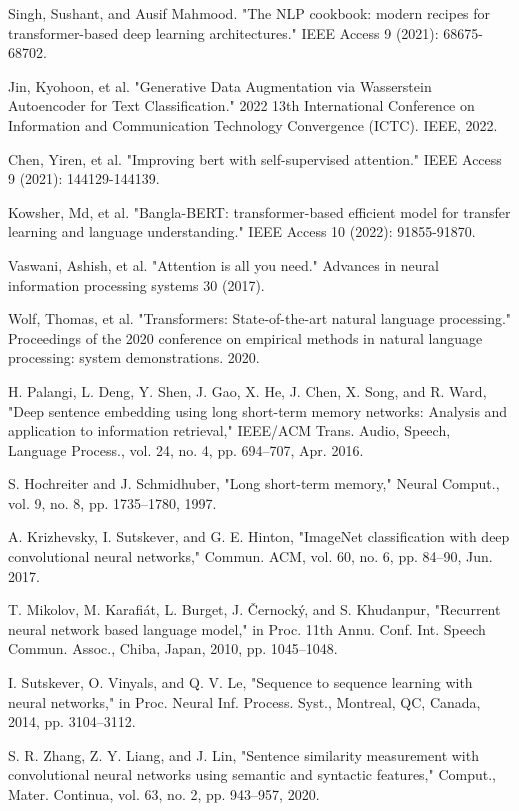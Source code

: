 \documentclass[conference]{IEEEtran}
\begin{document}
\begin{thebibliography}{00}
 Singh, Sushant, and Ausif Mahmood. "The NLP cookbook: modern recipes for transformer-based deep learning architectures." IEEE Access 9 (2021): 68675-68702.

 Jin, Kyohoon, et al. "Generative Data Augmentation via Wasserstein Autoencoder for Text Classification." 2022 13th International Conference on Information and Communication Technology Convergence (ICTC). IEEE, 2022.

 Chen, Yiren, et al. "Improving bert with self-supervised attention." IEEE Access 9 (2021): 144129-144139.

 Kowsher, Md, et al. "Bangla-BERT: transformer-based efficient model for transfer learning and language understanding." IEEE Access 10 (2022): 91855-91870.

 Vaswani, Ashish, et al. "Attention is all you need." Advances in neural information processing systems 30 (2017).

 Wolf, Thomas, et al. "Transformers: State-of-the-art natural language processing." Proceedings of the 2020 conference on empirical methods in natural language processing: system demonstrations. 2020.

 H. Palangi, L. Deng, Y. Shen, J. Gao, X. He, J. Chen, X. Song, and R. Ward, "Deep sentence embedding using long short-term memory networks: Analysis and application to information retrieval," IEEE/ACM Trans. Audio, Speech, Language Process., vol. 24, no. 4, pp. 694–707, Apr. 2016.

 S. Hochreiter and J. Schmidhuber, "Long short-term memory," Neural Comput., vol. 9, no. 8, pp. 1735–1780, 1997.

 A. Krizhevsky, I. Sutskever, and G. E. Hinton, "ImageNet classification with deep convolutional neural networks," Commun. ACM, vol. 60, no. 6, pp. 84–90, Jun. 2017.

 T. Mikolov, M. Karafiát, L. Burget, J. Černocký, and S. Khudanpur, "Recurrent neural network based language model," in Proc. 11th Annu. Conf. Int. Speech Commun. Assoc., Chiba, Japan, 2010, pp. 1045–1048.

 I. Sutskever, O. Vinyals, and Q. V. Le, "Sequence to sequence learning with neural networks," in Proc. Neural Inf. Process. Syst., Montreal, QC, Canada, 2014, pp. 3104–3112.

 S. R. Zhang, Z. Y. Liang, and J. Lin, "Sentence similarity measurement with convolutional neural networks using semantic and syntactic features," Comput., Mater. Continua, vol. 63, no. 2, pp. 943–957, 2020.


\end{thebibliography}
\end{document}
